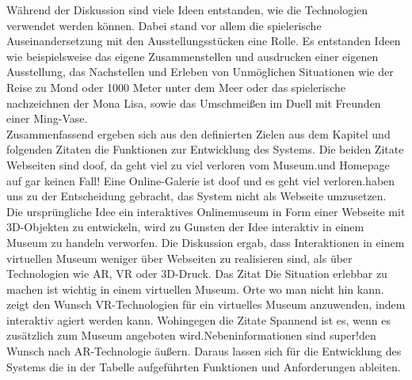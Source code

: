 \documentclass[runningheads,a4paper]{llncs}
\begin{document}
Während der Diskussion sind viele Ideen entstanden, wie die Technologien verwendet werden können. Dabei stand vor allem die spielerische Auseinandersetzung mit den Ausstellungsstücken eine Rolle. Es entstanden Ideen wie beispielsweise das eigene Zusammenstellen und ausdrucken einer eigenen Ausstellung, das Nachstellen und Erleben von Unmöglichen Situationen wie der Reise zu Mond oder 1000 Meter unter dem Meer oder das spielerische nachzeichnen der Mona Lisa, sowie das Umschmeißen im Duell mit Freunden einer Ming-Vase.\\

Zusammenfassend ergeben sich aus den definierten Zielen aus dem Kapitel  und folgenden Zitaten die Funktionen zur Entwicklung des Systems. 
Die beiden Zitate \glqq Webseiten sind doof, da geht viel zu viel verloren vom Museum.\grqq und \glqq Homepage auf gar keinen Fall! Eine Online-Galerie ist doof und es geht viel verloren.\grqq haben uns zu der Entscheidung gebracht, das System nicht als Webseite umzusetzen. Die ursprüngliche Idee ein interaktives Onlinemuseum in Form einer Webseite mit 3D-Objekten zu entwickeln, wird zu Gunsten der Idee interaktiv in einem Museum zu handeln verworfen. Die Diskussion ergab, dass Interaktionen in einem virtuellen Museum weniger über Webseiten zu realisieren sind, als über Technologien wie AR, VR oder 3D-Druck. Das Zitat
\glqq Die Situation erlebbar zu machen ist wichtig in einem virtuellen Museum. Orte wo man nicht hin kann.\grqq 
zeigt den Wunsch VR-Technologien für ein virtuelles Museum anzuwenden, indem interaktiv agiert werden kann. Wohingegen die Zitate
\glqq Spannend ist es, wenn es zusätzlich zum Museum angeboten wird.\grqq \glqq Nebeninformationen sind super!\grqq den Wunsch nach AR-Technologie äußern. 
Daraus lassen sich für die Entwicklung des Systems die in der Tabelle aufgeführten Funktionen und Anforderungen ableiten.
\end{document}
